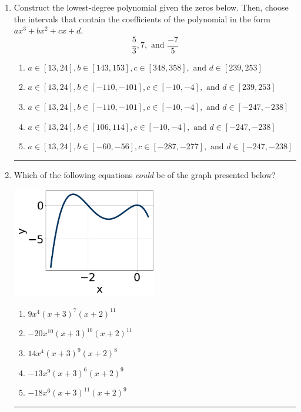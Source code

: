 \documentclass[14pt]{extbook}
\newcommand{\litem}[1]{\item#1\hspace*{-1cm}\rule{\textwidth}{0.4pt}}
\begin{document}
\begin{enumerate}
{\begin{enumerate}[label=\Alph*.]
\end{enumerate} }
\litem{
Construct the lowest-degree polynomial given the zeros below. Then, choose the intervals that contain the coefficients of the polynomial in the form $ax^3+bx^2+cx+d$.\[ \frac{5}{3}, 7, \text{ and } \frac{-7}{5} \]\begin{enumerate}[label=\Alph*.]
\item \( a \in [13, 24], b \in [143, 153], c \in [348, 358], \text{ and } d \in [239, 253] \)
\item \( a \in [13, 24], b \in [-110, -101], c \in [-10, -4], \text{ and } d \in [239, 253] \)
\item \( a \in [13, 24], b \in [-110, -101], c \in [-10, -4], \text{ and } d \in [-247, -238] \)
\item \( a \in [13, 24], b \in [106, 114], c \in [-10, -4], \text{ and } d \in [-247, -238] \)
\item \( a \in [13, 24], b \in [-60, -56], c \in [-287, -277], \text{ and } d \in [-247, -238] \)

\end{enumerate} }
\litem{
Which of the following equations \textit{could} be of the graph presented below?
\begin{center}
    \includegraphics[width=0.5\textwidth]{../Figures/polyGraphToFunctionCopyA.png}
\end{center}
\begin{enumerate}[label=\Alph*.]
\item \( 9x^{4} (x + 3)^{7} (x + 2)^{11} \)
\item \( -20x^{10} (x + 3)^{10} (x + 2)^{11} \)
\item \( 14x^{4} (x + 3)^{9} (x + 2)^{8} \)
\item \( -13x^{9} (x + 3)^{6} (x + 2)^{9} \)
\item \( -18x^{6} (x + 3)^{11} (x + 2)^{9} \)


\end{enumerate}}
\end{enumerate}
\end{document}
